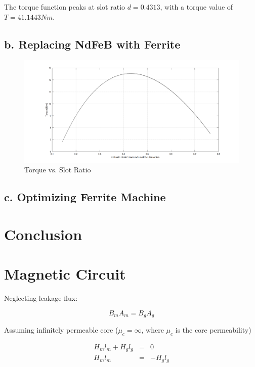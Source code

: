\documentclass[a4paper, 11pt, titlepage]{article}
\begin{document}
The torque function peaks at slot ratio $d=0.4313$, with a torque value of $T=41.1443Nm$.


\subsection{b. Replacing NdFeB with Ferrite}

\begin{figure}[h]
	\includegraphics[width=\textwidth]{torquevsD_Ferrite.png}
	\caption{Torque vs. Slot Ratio}
	\label{fig:TvsD}
\end{figure}

\subsection{c. Optimizing Ferrite Machine}

\section{Conclusion}

\appendix


\section{Magnetic Circuit}
\label{app:magneticCircuit}

Neglecting leakage flux:

\begin{equation}
	B_mA_m = B_gA_g
\end{equation}

Assuming infinitely permeable core ($\mu_c=\infty$, where $\mu_c$ is the core permeability)

\begin{eqnarray}
	H_ml_m + H_gl_g &=& 0 \\
	H_ml_m &=& -H_gl_g
\end{eqnarray}
\end{document}
